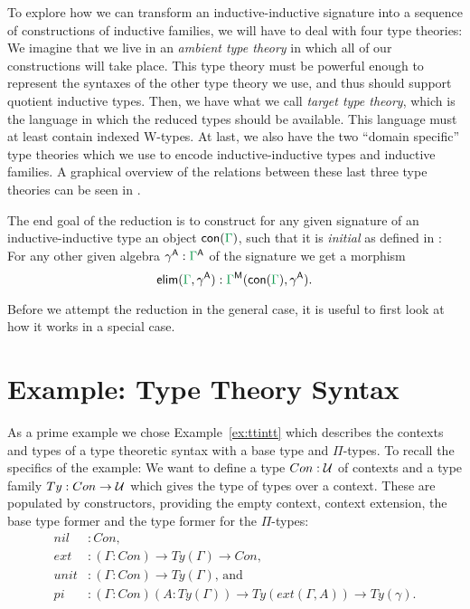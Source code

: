 To explore how we can transform an inductive-inductive signature into a sequence
of constructions of inductive families, we will have to deal with four type theories:
We imagine that we live in an \emph{ambient type theory} in which all of our constructions
will take place.
This type theory must be powerful enough to represent the syntaxes of the other
type theory we use, and thus should support quotient inductive types.
Then, we have what we call \emph{target type theory}, which is the language in
which the reduced types should be available.
This language must at least contain indexed W-types.
At last, we also have the two ``domain specific'' type theories which we use
to encode inductive-inductive types and inductive families.
A graphical overview of the relations between these last three type theories
can be seen in .

The end goal of the reduction is to construct for any given signature \grm{\Gamma}
of an inductive-inductive type an object $\con{\Gamma}$, such that it is \emph{initial}
as defined in :
For any other given algebra $\gamma^\CC : \grm{\Gamma}^\CC$ of the signature we
get a morphism
\begin{equation*}
\mathsf{elim}(\grm{\Gamma}, \gamma^\CC) : \grm{\Gamma}^\MM(\con{\Gamma}, \gamma^\CC).
\end{equation*}

Before we attempt the reduction in the general case, it is useful to first
look at how it works in a special case.

\section{Example: Type Theory Syntax}\label{sec:red-ex}

As a prime example we chose Example~\ref{ex:ttintt} which describes
the contexts and types of a type theoretic syntax with a base type and $\Pi$-types.
To recall the specifics of the example: We want to define a type
$Con : \mathcal{U}$ of contexts and a type family $Ty : Con \to \mathcal{U}$ which gives the
type of types over a context.
These are populated by constructors, providing the empty context,
context extension, the base type former and the type former for the $\Pi$-types:
\begin{align*}
nil &: Con \text{,} \\
ext &: (\Gamma : Con) \to Ty(\Gamma) \to Con \text{,} \\
unit &: (\Gamma : Con) \to Ty(\Gamma) \text{, and} \\
pi &: (\Gamma : Con) (A : Ty(\Gamma)) \to Ty(ext(\Gamma, A)) \to Ty(\gamma) \text{.}
\end{align*}

